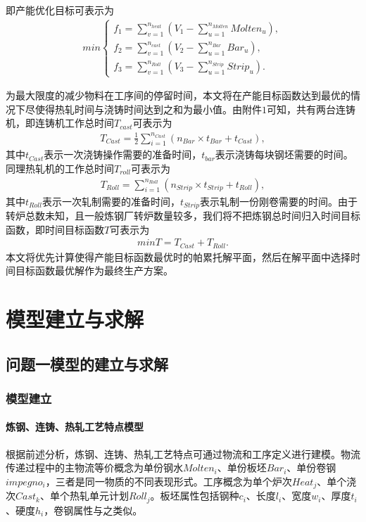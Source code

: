 \documentclass{whutmod}
\begin{document}
即产能优化目标可表示为
\begin{gather}
min \left\{\begin{matrix}f_1=\sum_{v=1}^{n_{heat}}( V_1-\sum_{u=1}^{n_{Molten}} Molten_u),
\\ f_2=\sum_{v=1}^{n_{cast}}( V_2-\sum_{u=1}^{n_{Bar}} Bar_u),
\\ f_3=\sum_{v=1}^{n_{Roll}}( V_3-\sum_{u=1}^{n_{Strip}} Strip_u).
\end{matrix}\right.
\end{gather}

为最大限度的减少物料在工序间的停留时间，本文将在产能目标函数达到最优的情况下尽使得热轧时间与浇铸时间达到之和为最小值。由附件$1$可知，共有两台连铸机，即连铸机工作总时间$T_{cast}$可表示为
\begin{gather*}
T_{Cast}=\frac{1}{2}\sum_{i=1}^{n_{Cast}}(n_{Bar}\times t_{Bar}+t_{Cast}),
\end{gather*}
其中$t_{Cast}$表示一次浇铸操作需要的准备时间，$t_{bar}$表示浇铸每块钢坯需要的时间。同理热轧机的工作总时间$T_{roll}$可表示为
\begin{gather*}
T_{Roll}=\sum_{i=1}^{n_{Roll}}(n_{Strip}\times t_{Strip}+t_{Roll}),
\end{gather*}
其中$t_{Roll}$表示一次轧制需要的准备时间，$t_{Strip}$表示轧制一份刚卷需要的时间。由于转炉总数未知，且一般炼钢厂转炉数量较多，我们将不把炼钢总时间归入时间目标函数，即时间目标函数$T$可表示为
\begin{gather}
minT=T_{Cast}+T_{Roll}.
\end{gather}
本文将优先计算使得产能目标函数最优时的帕累托解平面，然后在解平面中选择时间目标函数最优解作为最终生产方案。

\section{模型建立与求解}
\subsection{问题一模型的建立与求解}
\subsubsection{模型建立}
\paragraph{炼钢、连铸、热轧工艺特点模型}
根据前述分析，炼钢、连铸、热轧工艺特点可通过物流和工序定义进行建模。物流传递过程中的主物流等价概念为单份钢水$Molten_i$、单份板坯$Bar_i$、单份卷钢$ impegno_i$，三者是同一物质的不同表现形式。工序概念为单个炉次$Heat_j$、单个浇次$Cast_k$、单个热轧单元计划$Roll_j$。板坯属性包括钢种$c_i$、长度$l_i$、宽度$w_i$、厚度$t_i$、硬度$h_i$，卷钢属性与之类似。
\end{document}
